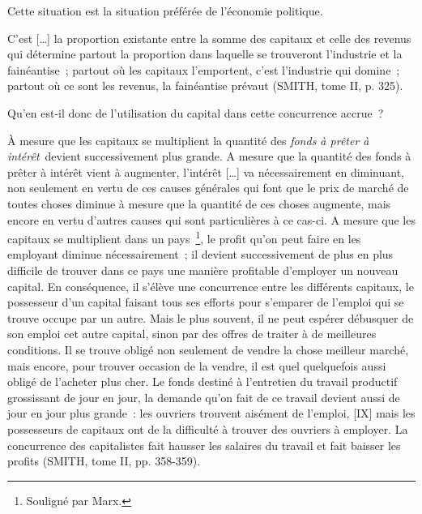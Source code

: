 \documentclass[french,twoside]{book} %
\newcommand\foreign[1]{\emph{#1}}
\newenvironment{quoteblock}%
  {\begin{quoting}}
  {\end{quoting}}
\newenvironment{quotebar}{%
    \def\FrameCommand{{\color{rubric!10!}\vrule width 0.5em} \hspace{0.9em}}%
    \def\OuterFrameSep{\itemsep} %
    \MakeFramed {\advance\hsize-\width \FrameRestore}
  }%
  {%
    \endMakeFramed
  }
\renewenvironment{quoteblock}%
  {%
    \savenotes
    \setstretch{0.9}
    \normalfont
    \begin{quotebar}
  }
  {%
    \end{quotebar}
    \spewnotes
  }
\begin{document}
\noindent Cette situation est la situation préférée de l’économie politique.\par

\begin{quoteblock}
 \noindent C’est […] la proportion existante entre la somme des capitaux et celle des revenus qui détermine partout la proportion dans laquelle se trouveront l’industrie et la fainéantise ; partout où les capitaux l’emportent, c’est l’industrie qui domine ; partout où ce sont les revenus, la fainéantise prévaut (SMITH, tome II, p. 325).
 \end{quoteblock}

\noindent Qu’en est-il donc de l’utilisation du capital dans cette concurrence accrue ?\par

\begin{quoteblock}
 \noindent À mesure que les capitaux se multiplient la quantité des \foreign{fonds à prêter à intérêt} devient successivement plus grande. A mesure que la quantité des fonds à prêter à intérêt vient à augmenter, l’intérêt […] va nécessairement en diminuant, non seulement en vertu de ces causes générales qui font que le prix de marché de toutes choses diminue à mesure que la quantité de ces choses augmente, mais encore en vertu d’autres causes qui sont particulières à ce cas-ci. A mesure que les capitaux se multiplient dans un pays \footnote{Souligné par Marx.}, le profit qu’on peut faire en les employant diminue nécessairement ; il devient successivement de plus en plus difficile de trouver dans ce pays une manière profitable d’employer un nouveau capital. En conséquence, il s’élève une concurrence entre les différents capitaux, le possesseur d’un capital faisant tous ses efforts pour s’emparer de l’emploi qui se trouve occupe par un autre. Mais le plus souvent, il ne peut espérer débusquer de son emploi cet autre capital, sinon par des offres de traiter à de meilleures conditions. Il se trouve obligé non seulement de vendre la chose meilleur marché, mais encore, pour trouver occasion de la vendre, il est quel quelquefois aussi obligé de l’acheter plus cher. Le fonds destiné à l’entretien du travail productif grossissant de jour en jour, la demande qu’on fait de ce travail devient aussi de jour en jour plus grande : les ouvriers trouvent aisément de l’emploi, [IX] mais les possesseurs de capitaux ont de la difficulté à trouver des ouvriers à employer. La concurrence des capitalistes fait hausser les salaires du travail et fait baisser les profits (SMITH, tome II, pp. 358-359).
 \end{quoteblock}
\end{document}

